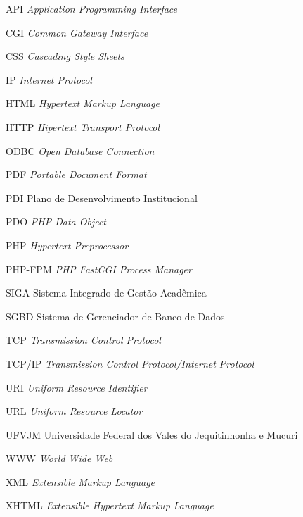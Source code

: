 \begin{siglas}
  \item[API] \textit{Application Programming Interface}
  \item[CGI] \textit{Common Gateway Interface}
  \item[CSS] \textit{Cascading Style Sheets}
  \item[IP] \textit{Internet Protocol}
  \item[HTML] \textit{Hypertext Markup Language}
  \item[HTTP] \textit{Hipertext Transport Protocol}
  \item[ODBC] \textit{Open Database Connection}
  \item[PDF] \textit{Portable Document Format}
  \item[PDI] Plano de Desenvolvimento Institucional
  \item[PDO] \textit{PHP Data Object}
  \item[PHP] \textit{Hypertext Preprocessor}
  \item[PHP-FPM] \textit{PHP FastCGI Process Manager}
  \item[SIGA] Sistema Integrado de Gestão Acadêmica
  \item[SGBD] Sistema de Gerenciador de Banco de Dados
  \item[TCP] \textit{Transmission Control Protocol}
  \item[TCP/IP] \textit{Transmission Control Protocol/Internet Protocol	}
  \item[URI] \textit{Uniform Resource Identifier}
  \item[URL] \textit{Uniform Resource Locator}
  \item[UFVJM] Universidade Federal dos Vales do Jequitinhonha e Mucuri
  \item[WWW] \textit{World Wide Web}
  \item[XML] \textit{Extensible Markup Language}
  \item[XHTML] \textit{Extensible Hypertext Markup Language}
\end{siglas}